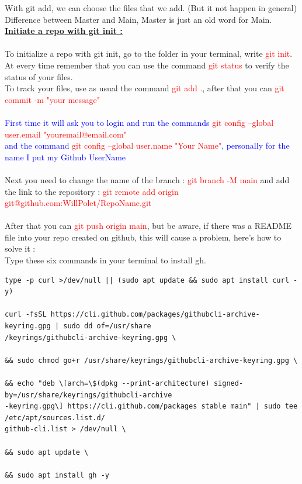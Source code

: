 \documentclass{article}
\begin{document}
With git add, we can choose the files that we add. (But it not happen in general) \\
Difference between Master and Main, Master is just an old word for Main. \\
\newpage
\noindent\textbf{\underline{Initiate a repo with git init :}} \\ \\
To initialize a repo with git init, go to the folder in your terminal, write \textcolor{red}{git init}. \\
At every time remember that you can use the command \textcolor{red}{git status} to verify the status of your files. \\
To track your files, use as usual the command \textcolor{red}{git add .}, after that you can \textcolor{red}{git commit -m "your message"} \\ \\
\textcolor{blue}{First time it will ask you to login and run the commands \textcolor{red}{git config --global user.email "youremail@email.com"} \\
and the command \textcolor{red}{git config --global user.name "Your Name"}, personally for the name I put my Github UserName} \\ \\
Next you need to change the name of the branch : \textcolor{red}{git branch -M main} and add the link to the repository : \textcolor{red}{git remote add origin git@github.com:WillPolet/RepoName.git} \\ \\
After that you can \textcolor{red}{git push origin main}, but be aware, if there was a README file into your repo created on github, this will cause a problem, here's how to solve it : \\
Type these six commands in your terminal to install gh.
{
\color{blue}%
\begin{verbatim}
type -p curl >/dev/null || (sudo apt update && sudo apt install curl -y)

curl -fsSL https://cli.github.com/packages/githubcli-archive-keyring.gpg | sudo dd of=/usr/share
/keyrings/githubcli-archive-keyring.gpg \

&& sudo chmod go+r /usr/share/keyrings/githubcli-archive-keyring.gpg \ 

&& echo "deb \[arch=\$(dpkg --print-architecture) signed-by=/usr/share/keyrings/githubcli-archive
-keyring.gpg\] https://cli.github.com/packages stable main" | sudo tee /etc/apt/sources.list.d/
github-cli.list > /dev/null \ 

&& sudo apt update \ 

&& sudo apt install gh -y 
\end{verbatim}
}
\end{document}
